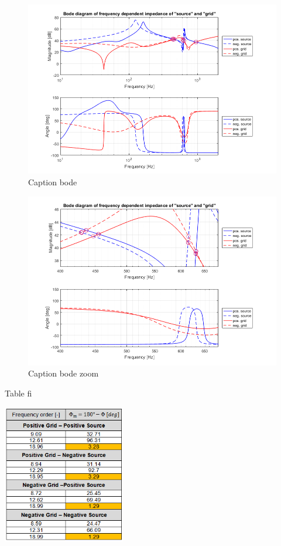 \documentclass[12pt]{report} %
\begin{document}
\begin{figure}[htb]
	\centering
	\includegraphics[width=1\textwidth]{img/Case3/Case3_Bode.png}
	\caption{Caption bode}
  	\label{fig:bode_case3}
\end{figure}
\FloatBarrier

\begin{figure}[htb]
	\centering
	\includegraphics[width=1\textwidth]{img/Case3/Case3_Bode_zoom.png}
	\caption{Caption bode zoom}
  	\label{fig:bode_zoom_case3}
\end{figure}
\FloatBarrier

\begin{table}[htb]
	\centering
	\caption{Table fi}
	\includegraphics[width=0.4\textwidth]{img/Case3/stability_fi.png}
  	\label{tab:stability_fi_case3}
\end{table}
\FloatBarrier
\end{document}

